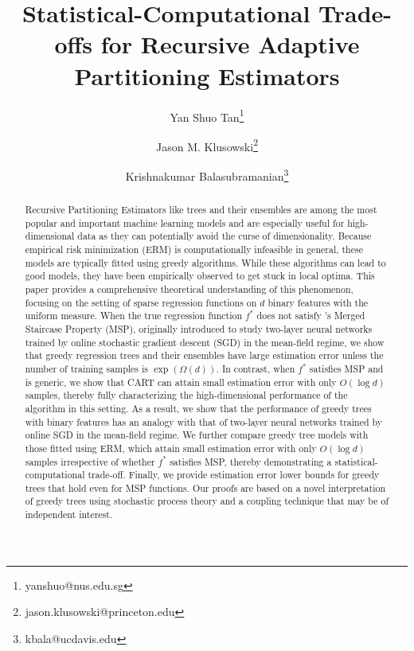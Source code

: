 \documentclass[11pt]{article}
\title{Statistical-Computational Trade-offs for Recursive Adaptive Partitioning Estimators}
\author[1]{Yan Shuo Tan\thanks{yanshuo@nus.edu.sg}}
\author[2]{Jason M. Klusowski\thanks{jason.klusowski@princeton.edu}}
\author[3]{Krishnakumar Balasubramanian\thanks{kbala@ucdavis.edu}}
\affil[1]{\small Department of Statistics and Data Science, National University of Singapore}
\affil[2]{\small Department of Operations Research and Financial Engineering, Princeton University}
\affil[3]{\small Department of Statistics, University of California, Davis}
\date{}
\newcommand{\nfeats}{d}
\begin{document}
\maketitle
\iffalse
\begin{abstract}
    Recursive Partitioning Estimators like trees and their ensembles are among the most popular and important machine learning models and are especially useful for high-dimensional data as they can potentially avoid the curse of dimensionality. 
Because empirical risk minimization (ERM) is computationally infeasible in general, these models are typically fitted using greedy algorithms. 
While these algorithms can lead to good models, they have been empirically observed to get stuck in local optima. 
This paper provides a comprehensive theoretical understanding of this phenomenon, focusing on the setting of sparse regression functions on $\nfeats$ binary features with the uniform measure.
When the true regression function $f^*$ does not satisfy \cite{abbe2022merged}'s Merged Staircase Property (MSP), originally introduced to study two-layer neural networks trained by online stochastic gradient descent (SGD) in the mean-field regime, we show that greedy regression trees and their ensembles have large estimation error unless the number of training samples is $\exp(\Omega(\nfeats))$. 
In contrast, when $f^*$ satisfies MSP and is generic, we show that CART can attain small estimation error with only $O(\log \nfeats)$ samples, thereby fully characterizing the high-dimensional performance of the algorithm in this setting. 
As a result, we show that the performance of greedy trees with binary features has an analogy with that of two-layer neural networks trained by online SGD in the mean-field regime.
We further compare greedy tree models with those fitted using ERM, which attain small estimation error with only $O(\log \nfeats)$ samples irrespective of whether $f^*$ satisfies MSP, thereby demonstrating a statistical-computational trade-off. Finally, we provide estimation error lower bounds for greedy trees that hold even for MSP functions. 
Our proofs are based on a novel interpretation of greedy trees using stochastic process theory and a coupling technique that may be of independent interest.
    

\end{abstract}
\end{document}
